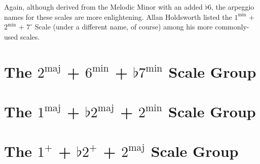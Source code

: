 \documentclass[english]{./gbook}
\begin{document}
\begin{large}
Again, although derived from the Melodic Minor with an added $\flat$6, the arpeggio names for these scales are more enlightening. Allan Holdsworth listed the $1^{\text{min}}$ + $2^{\text{min}}$ + $7^\circ$ Scale (under a different name, of course) among his more commonly-used scales.



\section{The $2^{\text{maj}}$ + $6^{\text{min}}$ + $\flat 7^{\text{min}}$ Scale Group}

\section{The $1^{\text{maj}}$ + $\flat 2^{\text{maj}}$ + $2^{\text{min}}$ Scale Group}

\section{The $1^+$ + $\flat 2^+$ + $2^{\text{maj}}$ Scale Group}


\end{large}
\end{document}
